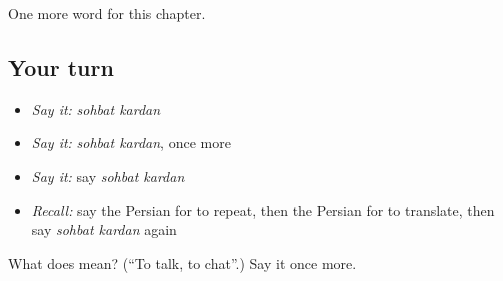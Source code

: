 \begin{grammarlens}[title={What you've built}]
One more word for this chapter.
\end{grammarlens}

\subsection*{Your turn}
\begin{itemize}
\raggedright
  \item \emph{Say it:} \emph{sohbat kardan}
  \item \emph{Say it:} \emph{sohbat kardan}, once more
  \item \emph{Say it:} say \emph{sohbat kardan}
  \item \emph{Recall:} say the Persian for to repeat, then the Persian for to translate, then say \emph{sohbat kardan} again
\end{itemize}

\begin{tcolorbox}[breakable,colback=teal!4,colframe=teal!35!black,title={Before you move on}]
What does   mean? (\textquotedblleft{}To talk, to chat\textquotedblright{}.) Say it once more.
\end{tcolorbox}
